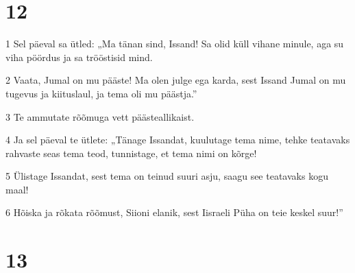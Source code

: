 \chapter{12}

\par 1 Sel päeval sa ütled: „Ma tänan sind, Issand! Sa olid küll vihane minule, aga su viha pöördus ja sa trööstisid mind.
\par 2 Vaata, Jumal on mu pääste! Ma olen julge ega karda, sest Issand Jumal on mu tugevus ja kiituslaul, ja tema oli mu päästja.”
\par 3 Te ammutate rõõmuga vett päästeallikaist.
\par 4 Ja sel päeval te ütlete: „Tänage Issandat, kuulutage tema nime, tehke teatavaks rahvaste seas tema teod, tunnistage, et tema nimi on kõrge!
\par 5 Ülistage Issandat, sest tema on teinud suuri asju, saagu see teatavaks kogu maal!
\par 6 Hõiska ja rõkata rõõmust, Siioni elanik, sest Iisraeli Püha on teie keskel suur!”

\chapter{13}

